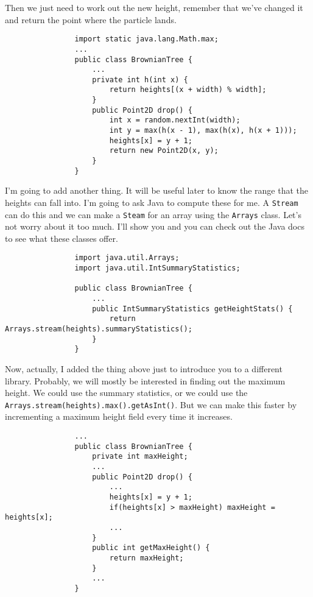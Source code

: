 \documentclass{article}
\begin{document}
            Then we just need to work out the new height, remember that we've changed it and return the point where the particle lands.
            
            \begin{verbatim}
                import static java.lang.Math.max;
                ...
                public class BrownianTree {
                    ...
                    private int h(int x) {
                        return heights[(x + width) % width];
                    }
                    public Point2D drop() {
                        int x = random.nextInt(width);
                        int y = max(h(x - 1), max(h(x), h(x + 1)));
                        heights[x] = y + 1;
                        return new Point2D(x, y);
                    }
                }
            \end{verbatim}

            I'm going to add another thing. It will be useful later to know the range that the heights can fall into. I'm going to ask
            Java to compute these for me. A \texttt{Stream} can do this and we can make a \texttt{Steam} for an array using the
            \texttt{Arrays} class. Let's not worry about it too much. I'll show you and you can check out the Java docs to see what these
            classes offer.
            
            \begin{verbatim}
                import java.util.Arrays;
                import java.util.IntSummaryStatistics;

                public class BrownianTree {
                    ...
                    public IntSummaryStatistics getHeightStats() {
                        return Arrays.stream(heights).summaryStatistics();
                    }
                }
            \end{verbatim}
            
            \newpage
            Now, actually, I added the thing above just to introduce you to a different library. Probably, we will mostly be interested in
            finding out the maximum height. We could use the summary statistics, or we could use the
            \texttt{Arrays.stream(heights).max().getAsInt()}. But we can make this faster by incrementing a maximum height field every time
            it increases.
            
            \begin{verbatim}
                ...
                public class BrownianTree {
                    private int maxHeight;
                    ...
                    public Point2D drop() {
                        ...
                        heights[x] = y + 1;
                        if(heights[x] > maxHeight) maxHeight = heights[x];
                        ...
                    }
                    public int getMaxHeight() {
                        return maxHeight;
                    }
                    ...
                }
            \end{verbatim}
            
\end{document}
